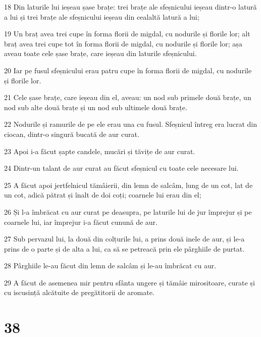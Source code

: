 \par 18 Din laturile lui ieșeau șase brațe: trei brațe ale sfeșnicului ieșeau dintr-o latură a lui și trei brațe ale sfeșnicului ieșeau din cealaltă latură a lui;
\par 19 Un braț avea trei cupe în forma florii de migdal, cu nodurile și florile lor; alt braț avea trei cupe tot în forma florii de migdal, cu nodurile și florile lor; așa aveau toate cele șase brațe, care ieșeau din laturile sfeșnicului.
\par 20 Iar pe fusul sfeșnicului erau patru cupe în forma florii de migdal, cu nodurile și florile lor.
\par 21 Cele șase brațe, care ieșeau din el, aveau: un nod sub primele două brațe, un nod sub alte două brațe și un nod sub ultimele două brațe.
\par 22 Nodurile și ramurile de pe ele erau una cu fusul. Sfeșnicul întreg era lucrat din ciocan, dintr-o singură bucată de aur curat.
\par 23 Apoi i-a făcut șapte candele, mucări și tăvițe de aur curat.
\par 24 Dintr-un talant de aur curat au făcut sfeșnicul cu toate cele necesare lui.
\par 25 A făcut apoi jertfelnicul tămâierii, din lemn de salcâm, lung de un cot, lat de un cot, adică pătrat și înalt de doi coți; coarnele lui erau din el;
\par 26 Și l-a îmbrăcat cu aur curat pe deasupra, pe laturile lui de jur împrejur și pe coarnele lui, iar împrejur i-a făcut cunună de aur.
\par 27 Sub pervazul lui, la două din colțurile lui, a prins două inele de aur, și le-a prins de o parte și de alta a lui, ca să se petreacă prin ele pârghiile de purtat.
\par 28 Pârghiile le-au făcut din lemn de salcâm și le-au îmbrăcat cu aur.
\par 29 A făcut de asemenea mir pentru sfânta ungere și tămâie mirositoare, curate și cu iscusință alcătuite de pregătitorii de aromate.

\chapter{38}

